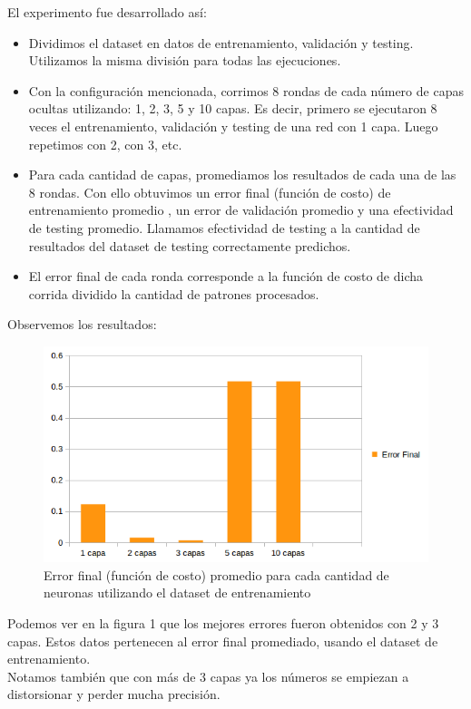 El experimento fue desarrollado así: 
\begin{itemize}
\item Dividimos el dataset en datos de entrenamiento, validación y testing. Utilizamos la misma división para todas las ejecuciones.
\item Con la configuración mencionada, corrimos 8 rondas de cada número de capas ocultas utilizando: 1, 2, 3, 5 y 10 capas.
Es decir, primero se ejecutaron 8 veces el entrenamiento, validación y testing de una red con 1 capa. Luego repetimos con 2, con 3, etc.
\item Para cada cantidad de capas, promediamos los resultados de cada una de las 8 rondas. Con ello obtuvimos un error final (función de costo) de entrenamiento promedio , un error de validación promedio y una efectividad de testing promedio. Llamamos efectividad de testing a la cantidad de resultados del dataset de testing correctamente predichos.
\item El error final de cada ronda corresponde a la función de costo de dicha corrida dividido la cantidad de patrones procesados.
\end{itemize}

Observemos los resultados:\\

\begin{figure}[h]
  \begin{center}
  \includegraphics[scale=0.75]{graficos/fig1_cant_capas_error_final.png}
  \caption{Error final (función de costo) promedio para cada cantidad de neuronas utilizando el dataset de entrenamiento}
  \end{center}
\end{figure}

Podemos ver en la figura 1 que los mejores errores fueron obtenidos con 2 y 3 capas. Estos datos pertenecen al error final promediado, usando el dataset de entrenamiento.\\
Notamos también que con más de 3 capas ya los números se empiezan a distorsionar y perder mucha precisión.

